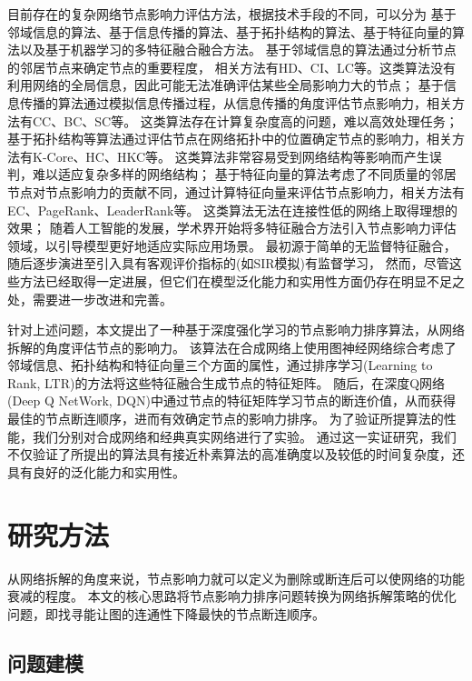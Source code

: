 \documentclass[twocolumn]{morningstar}
\begin{document}
目前存在的复杂网络节点影响力评估方法，根据技术手段的不同，可以分为
基于邻域信息的算法、基于信息传播的算法、基于拓扑结构的算法、基于特征向量的算法以及基于机器学习的多特征融合融合方法。
基于邻域信息的算法通过分析节点的邻居节点来确定节点的重要程度，
相关方法有HD、CI\cite{morone2015CI}、LC\cite{chen2012LC}等。这类算法没有利用网络的全局信息，因此可能无法准确评估某些全局影响力大的节点；
基于信息传播的算法通过模拟信息传播过程，从信息传播的角度评估节点影响力，相关方法有CC、BC、SC等。
这类算法存在计算复杂度高的问题，难以高效处理任务\cite{barabasi2016网络科学书}；
基于拓扑结构等算法通过评估节点在网络拓扑中的位置确定节点的影响力，相关方法有K-Core\cite{gao2021K-Core}、HC\cite{lu2016H-Index}、HKC\cite{zareie2018HKC}等。
这类算法非常容易受到网络结构等影响而产生误判，难以适应复杂多样的网络结构；
基于特征向量的算法考虑了不同质量的邻居节点对节点影响力的贡献不同，通过计算特征向量来评估节点影响力，相关方法有EC、PageRank、LeaderRank等。
这类算法无法在连接性低的网络上取得理想的效果；
随着人工智能的发展，学术界开始将多特征融合方法引入节点影响力评估领域，以引导模型更好地适应实际应用场景。
最初源于简单的无监督特征融合\cite{asgharian2023无监督特征融合_1}，随后逐步演进至引入具有客观评价指标的(如SIR模拟)有监督学习\cite{杨洋2023有监督SIR模拟}，
然而，尽管这些方法已经取得一定进展，但它们在模型泛化能力和实用性方面仍存在明显不足之处，需要进一步改进和完善。


针对上述问题，本文提出了一种基于深度强化学习的节点影响力排序算法，从网络拆解的角度评估节点的影响力。
该算法在合成网络上使用图神经网络综合考虑了邻域信息、拓扑结构和特征向量三个方面的属性，通过排序学习(Learning to Rank, LTR)\cite{li2023LTR}的方法将这些特征融合生成节点的特征矩阵。
随后，在深度Q网络(Deep Q NetWork, DQN)\cite{hessel2017DQN_1}中通过节点的特征矩阵学习节点的断连价值，从而获得最佳的节点断连顺序，进而有效确定节点的影响力排序。
为了验证所提算法的性能，我们分别对合成网络和经典真实网络进行了实验。
通过这一实证研究，我们不仅验证了所提出的算法具有接近朴素算法的高准确度以及较低的时间复杂度，还具有良好的泛化能力和实用性。


\section{研究方法}\label{sec:Methods}

从网络拆解的角度来说，节点影响力就可以定义为删除或断连后可以使网络的功能衰减的程度\cite{李天梅2019复杂网络的关键节点识别}。
本文的核心思路将节点影响力排序问题转换为网络拆解策略的优化问题，即找寻能让图的连通性下降最快的节点断连顺序。

\subsection{问题建模}\label{sec:ProblemFormulation}
\end{document}
